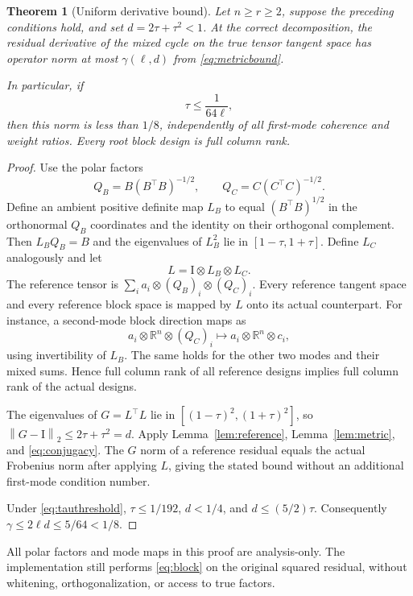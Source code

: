 \documentclass[11pt]{article}
\newtheorem{theorem}{Theorem}[section]
\theoremstyle{remark}\newtheorem{remark}[theorem]{Remark}
\newcommand{\R}{\mathbb R}
\newcommand{\norm}[1]{\left\lVert#1\right\rVert}
\newcommand{\Id}{\mathrm I}
\begin{document}
\begin{theorem}[Uniform derivative bound]\label{thm:localrate}
Let $n\ge r\ge2$, suppose the preceding conditions hold, and set $d=2\tau+\tau^2<1$. At the correct decomposition, the residual derivative of the mixed cycle on the true tensor tangent space has operator norm at most $\gamma(\ell,d)$ from \eqref{eq:metricbound}.

In particular, if
\begin{equation}\label{eq:tauthreshold}
 \tau\le\frac{1}{64\ell},
\end{equation}
then this norm is less than $1/8$, independently of all first-mode coherence and weight ratios. Every root block design is full column rank.
\end{theorem}
\begin{proof}
Use the polar factors
\[
 Q_B=B(B^\top B)^{-1/2},\qquad Q_C=C(C^\top C)^{-1/2}.
\]
Define an ambient positive definite map $L_B$ to equal $(B^\top B)^{1/2}$ in the orthonormal $Q_B$ coordinates and the identity on their orthogonal complement. Then $L_BQ_B=B$ and the eigenvalues of $L_B^2$ lie in $[1-\tau,1+\tau]$. Define $L_C$ analogously and let
\[
 L=\Id\otimes L_B\otimes L_C.
\]
The reference tensor is $\sum_i a_i\otimes (Q_B)_i\otimes (Q_C)_i$. Every reference tangent space and every reference block space is mapped by $L$ onto its actual counterpart. For instance, a second-mode block direction maps as
\[
 a_i\otimes\R^n\otimes(Q_C)_i
 \longmapsto a_i\otimes\R^n\otimes c_i,
\]
using invertibility of $L_B$. The same holds for the other two modes and their mixed sums. Hence full column rank of all reference designs implies full column rank of the actual designs.

The eigenvalues of $G=L^\top L$ lie in $[(1-\tau)^2,(1+\tau)^2]$, so $\norm{G-\Id}_2\le2\tau+\tau^2=d$. Apply Lemma~\ref{lem:reference}, Lemma~\ref{lem:metric}, and \eqref{eq:conjugacy}. The $G$ norm of a reference residual equals the actual Frobenius norm after applying $L$, giving the stated bound without an additional first-mode condition number.

Under \eqref{eq:tauthreshold}, $\tau\le1/192$, $d<1/4$, and $d\le(5/2)\tau$. Consequently $\gamma\le2\ell d\le5/64<1/8$.
\end{proof}

All polar factors and mode maps in this proof are analysis-only. The implementation still performs \eqref{eq:block} on the original squared residual, without whitening, orthogonalization, or access to true factors.
\end{document}
